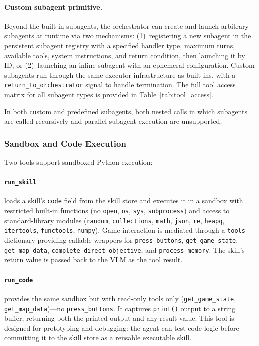 \paragraph{Custom subagent primitive.} Beyond the built-in subagents, the orchestrator can create and launch arbitrary subagents at runtime via two mechanisms: (1)~registering a new subagent in the persistent subagent registry with a specified handler type, maximum turns, available tools, system instructions, and return condition, then launching it by ID; or (2)~launching an inline subagent with an ephemeral configuration. Custom subagents run through the same executor infrastructure as built-ins, with a \texttt{return\_to\_orchestrator} signal to handle termination. The full tool access matrix for all subagent types is provided in Table~\ref{tab:tool_access}.

In both custom and predefined subagents, both nested calls in which subagents are called recursively and parallel subagent execution are unsupported.


\subsubsection{Sandbox and Code Execution}\label{sec:sandbox}

Two tools support sandboxed Python execution:

\paragraph{\texttt{run\_skill}} loads a skill's \texttt{code} field from the skill store and executes it in a sandbox with restricted built-in functions (no \texttt{open}, \texttt{os}, \texttt{sys}, \texttt{subprocess}) and access to standard-library modules (\texttt{random}, \texttt{collections}, \texttt{math}, \texttt{json}, \texttt{re}, \texttt{heapq}, \texttt{itertools}, \texttt{functools}, \texttt{numpy}). Game interaction is mediated through a \texttt{tools} dictionary providing callable wrappers for \texttt{press\_buttons}, \texttt{get\_game\_state}, \texttt{get\_map\_data}, \texttt{complete\_direct\_objective}, and \texttt{process\_memory}. The skill's return value is passed back to the VLM as the tool result.

\paragraph{\texttt{run\_code}} provides the same sandbox but with read-only tools only (\texttt{get\_game\_state}, \texttt{get\_map\_data})---no \texttt{press\_buttons}. It captures \texttt{print()} output to a string buffer, returning both the printed output and any result value. This tool is designed for prototyping and debugging: the agent can test code logic before committing it to the skill store as a reusable executable skill.


